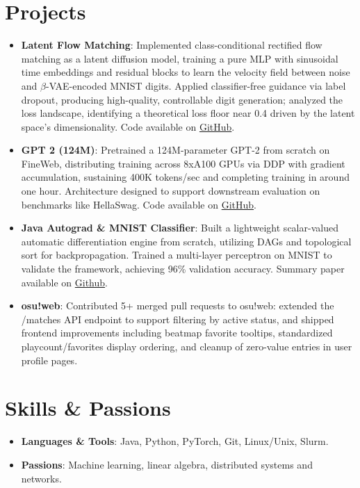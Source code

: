 \documentclass[letterpaper,11pt]{article}
\newcommand{\resumeItem}[2]{
  \item\small{
    \textbf{#1}{: #2 \vspace{-2pt}}
  }
}
\newcommand{\resumeSubItem}[2]{\resumeItem{#1}{#2}\vspace{-4pt}}
\newcommand{\resumeSubHeadingListStart}{\begin{itemize}[leftmargin=0.15in, label={}]}
\newcommand{\resumeSubHeadingListEnd}{\end{itemize}}
\begin{document}
\section{Projects}
  \resumeSubHeadingListStart
    \resumeSubItem{Latent Flow Matching}
    {Implemented class-conditional rectified flow matching as a latent diffusion model, training a pure MLP with sinusoidal time embeddings and residual blocks to learn the velocity field between noise and $\beta$-VAE-encoded MNIST digits.
    Applied classifier-free guidance via label dropout, producing high-quality, controllable digit generation; analyzed the loss landscape, identifying a theoretical loss floor near 0.4 driven by the latent space's dimensionality. Code available on \href{https://github.com/someonecantcode/VarationalAutoencoder}{GitHub}.}
    \resumeSubItem{GPT 2 (124M)}
    {Pretrained a 124M-parameter GPT-2 from scratch on FineWeb, distributing training across 8xA100 GPUs via DDP with gradient accumulation, sustaining 400K tokens/sec and completing training in around one hour. Architecture designed to support downstream evaluation on benchmarks like HellaSwag. Code available on \href{https://github.com/someonecantcode/nn-pract}{GitHub}.}
    \resumeSubItem{Java Autograd \& MNIST Classifier}
    {Built a lightweight scalar-valued automatic differentiation engine from scratch, utilizing DAGs and topological sort for backpropagation. Trained a multi-layer perceptron on MNIST to validate the framework, achieving 96\% validation accuracy. 
    Summary paper available on \href{https://github.com/someonecantcode/nn-pract/blob/main/micrograd/paper/CSPaper.pdf}{Github}.}
    \resumeSubItem{osu!web}
    {Contributed 5+ merged pull requests to osu!web: extended the /matches API endpoint to support filtering by active status, and shipped frontend improvements including beatmap favorite tooltips, standardized playcount/favorites display ordering, and cleanup of zero-value entries in user profile pages.}
  \resumeSubHeadingListEnd

\section{Skills \& Passions}
 \resumeSubHeadingListStart
  \resumeSubItem{Languages \& Tools}
        {Java, Python, PyTorch, Git, Linux/Unix, Slurm.}
  \resumeSubItem{Passions}
        {Machine learning, linear algebra, distributed systems and networks.}     
 \resumeSubHeadingListEnd
\end{document}
